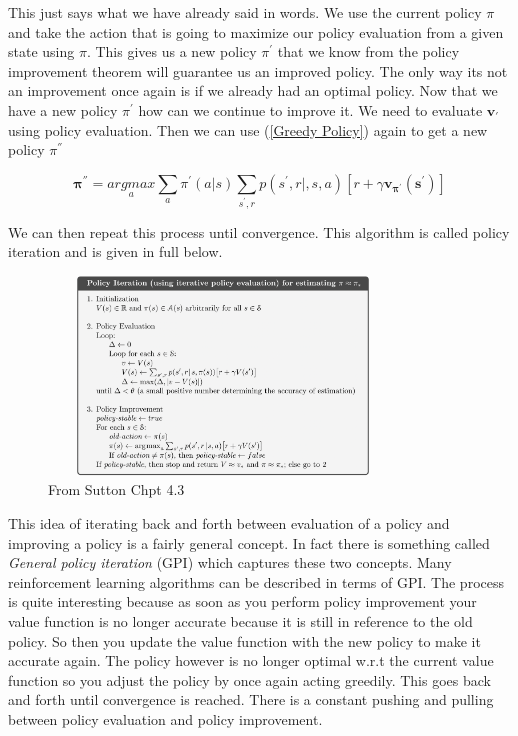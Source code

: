 This just says what we have already said in words. We use the current policy $\pi$ and take the action that is going to maximize our policy evaluation from a given state using $\pi$. This gives us a new policy $\pi^{'}$ that we know from the policy improvement theorem will guarantee us an improved policy. The only way its not an improvement once again is if we already had an optimal policy. Now that we have a new policy $\pi^{'}$ how can we continue to improve it. We need to evaluate $\mathbf{v_{'}}$ using policy evaluation. Then we can use (\ref{Greedy Policy}) again to get a new policy $\pi^{''}$

$$ \mathbf{\pi^{''}} = \underset{a}{argmax}\underset{a}{\sum}\pi^{'}(a|s)\underset{s^{'},r}{\sum}p(s^{'},r|,s,a)[ r + \gamma \mathbf{v_{\pi^{'}}(s^{'})}]
$$

We can then repeat this process until convergence. This algorithm is called \textit{}{policy iteration} and is given in full below. 

 \begin{figure}[h!]
        \centering
        \includegraphics[width=350px,height=200px]{images/policy_iteration.png}
        \caption{From Sutton Chpt 4.3}
        \label{fig:my_label}
    \end{figure}

This idea of iterating back and forth between evaluation of a policy and improving a policy is a fairly general concept. In fact there is something called \textit{General policy iteration} (GPI) which captures these two concepts. Many reinforcement learning algorithms can be described in terms of GPI. The process is quite interesting because as soon as you perform policy improvement your value function is no longer accurate because it is still in reference to the old policy. So then you update the value function with the new policy to make it accurate again. The policy however is no longer optimal w.r.t the current value function so you adjust the policy by once again acting greedily. This goes back and forth until convergence is reached. There is a constant pushing and pulling between policy evaluation and policy improvement. 




